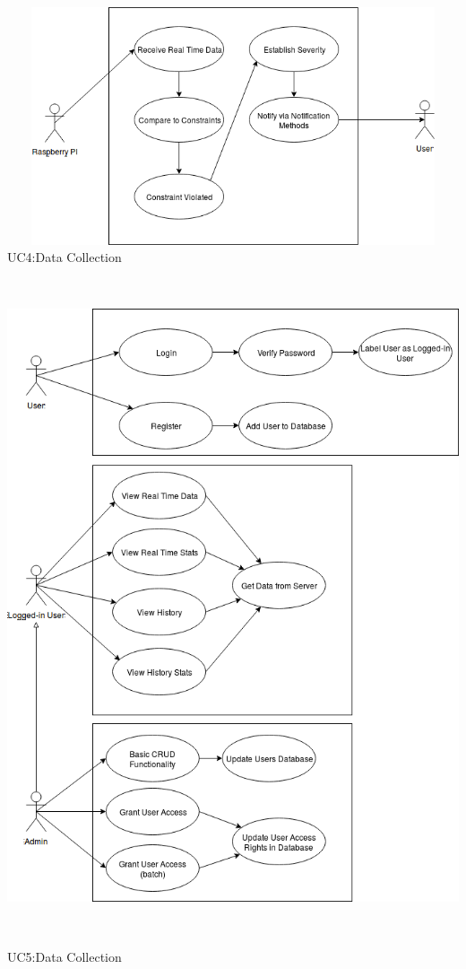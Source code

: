\begin{center}
\includegraphics[width=15cm, height=7cm]{Diagrams/UseCase4.png}
UC4:Data Collection
\\

\includegraphics[width=15cm, height=20cm]{Diagrams/UseCase5.png}
UC5:Data Collection

\end{center}